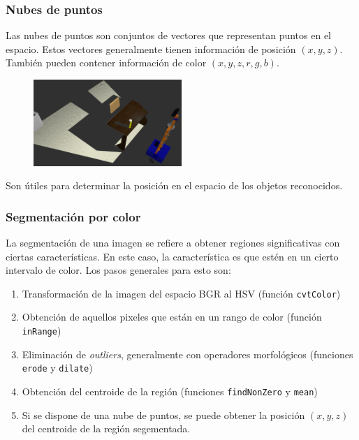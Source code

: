 \begin{frame}\frametitle{Nubes de puntos}
  Las nubes de puntos son conjuntos de vectores que representan puntos en el espacio. Estos vectores generalmente tienen información de posición $(x,y,z)$. También pueden contener información de color $(x,y,z,r,g,b)$.
  \begin{figure}
      \centering
      \includegraphics[width=0.5\textwidth]{Figures/CloudExample.png}
  \end{figure}
  Son útiles para determinar la posición en el espacio de los objetos reconocidos. 
\end{frame}

\begin{frame}\frametitle{Segmentación por color}
  La segmentación de una imagen se refiere a obtener regiones significativas con ciertas características. En este caso, la característica es que estén en un cierto intervalo de color. Los pasos generales para esto son:
  \begin{enumerate}
  \item Transformación de la imagen del espacio BGR al HSV (función \texttt{cvtColor})
  \item Obtención de aquellos pixeles que están en un rango de color (función \texttt{inRange})
  \item Eliminación de \textit{outliers}, generalmente con operadores morfológicos (funciones \texttt{erode} y \texttt{dilate})
  \item Obtención del centroide de la región (funciones \texttt{findNonZero} y \texttt{mean})
  \item Si se dispone de una nube de puntos, se puede obtener la posición $(x,y,z)$ del centroide de la región segementada. 
  \end{enumerate}
\end{frame}

